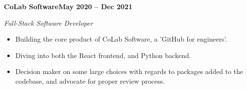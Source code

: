 \vspace{0.1cm}
\textbf{CoLab Software\hfill  May 2020 -- Dec 2021} \par
\textit{Full-Stack Software Developer} \par
\begin{itemize}
	\item Building the core product of CoLab Software, a 'GitHub for engineers'.
	\item Diving into both the React frontend, and Python backend.
	\item Decision maker on some large choices with regards to packages added to the codebase, and advocate for proper review process.
\end{itemize} \par